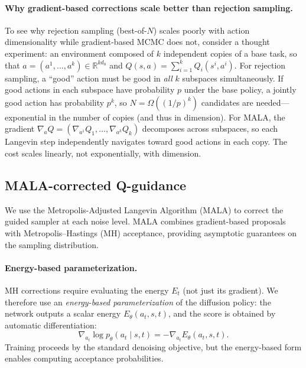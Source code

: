 \documentclass{article}
\theoremstyle{plain}
\theoremstyle{definition}
\theoremstyle{remark}
\begin{document}
\paragraph{Why gradient-based corrections scale better than rejection sampling.}
To see why rejection sampling (best-of-$N$) scales poorly with action dimensionality while gradient-based MCMC does not, consider a thought experiment: an environment composed of $k$ independent copies of a base task, so that $a = (a^1, \ldots, a^k) \in \mathbb{R}^{k d_0}$ and $Q(s,a) = \sum_{i=1}^k Q_i(s^i, a^i)$.
For rejection sampling, a ``good'' action must be good in \emph{all} $k$ subspaces simultaneously.
If good actions in each subspace have probability $p$ under the base policy, a jointly good action has probability $p^k$, so $N = \Omega((1/p)^k)$ candidates are needed---exponential in the number of copies (and thus in dimension).
For MALA, the gradient $\nabla_a Q = (\nabla_{a^1} Q_1, \ldots, \nabla_{a^k} Q_k)$ decomposes across subspaces, so each Langevin step independently navigates toward good actions in each copy.
The cost scales linearly, not exponentially, with dimension.

\subsection{MALA-corrected Q-guidance}
\label{sec:mala}

We use the Metropolis-Adjusted Langevin Algorithm (MALA) to correct the guided sampler at each noise level.
MALA combines gradient-based proposals with Metropolis--Hastings (MH) acceptance, providing asymptotic guarantees on the sampling distribution.

\paragraph{Energy-based parameterization.}
MH corrections require evaluating the energy $E_t$ (not just its gradient).
We therefore use an \emph{energy-based parameterization} of the diffusion policy: the network outputs a scalar energy $E_\theta(a_t, s, t)$, and the score is obtained by automatic differentiation:
\begin{equation}
  \nabla_{a_t} \log p_\theta(a_t \mid s, t) = -\nabla_{a_t} E_\theta(a_t, s, t).
  \label{eq:energy-param}
\end{equation}
Training proceeds by the standard denoising objective, but the energy-based form enables computing acceptance probabilities.
\end{document}
